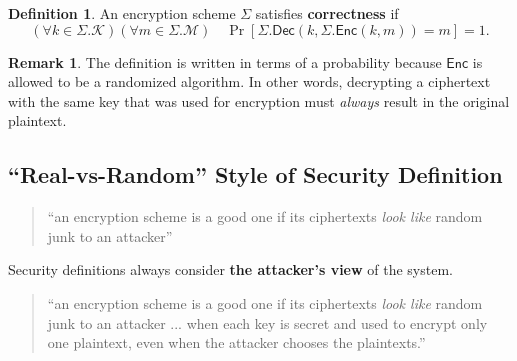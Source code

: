 \documentclass[12pt,openany]{book}
\theoremstyle{definition}
\newtheorem{definition}{Definition}[chapter]
\newtheorem{remark}{Remark}[chapter]
\newtheorem{example}{Example}[chapter]
\newcommand{\Enc}{\mathsf{Enc}}
\newcommand{\Dec}{\mathsf{Dec}}
\newcommand{\scheme}{\Sigma}
\newcommand{\keyspace}{\mathcal{K}}
\newcommand{\messagespace}{\mathcal{M}}
\begin{document}
	\vspace{8pt}
	\begin{tcolorbox}[colback=white,colframe=defcolor,arc=5pt,title={\color{white}\bf SKE Correctness}]
		\begin{definition}
			An encryption scheme $\scheme$ satisfies \textbf{correctness} if \[
			\left(\forall k\in\scheme.\keyspace\right)\left(\forall m\in\scheme.\messagespace
			\right)\quad\Pr\left[\scheme.\Dec(k, \scheme.\Enc(k,m))=m\right]=1.
			\]
		\end{definition}
	\end{tcolorbox}
	\begin{remark}
		The definition is written in terms of a probability because $\Enc$ is allowed to be a randomized algorithm. In other words, decrypting a ciphertext with the same key that was used for encryption must \textit{always} result in the original plaintext.
	\end{remark}
	\vspace{4pt}
	
	\subsection{``Real-vs-Random'' Style of Security Definition}
	\begin{quote}
		``an encryption scheme is a good one if its ciphertexts \textit{look like} random junk to an attacker''
	\end{quote}

	Security definitions always consider \textbf{the attacker's view} of the system.
	\begin{quote}
		``an encryption scheme is a good one if its ciphertexts \textit{look like} random junk to an attacker ... when each key is secret and used to encrypt only one plaintext, even when the attacker chooses the plaintexts.''
	\end{quote}
\end{document}
